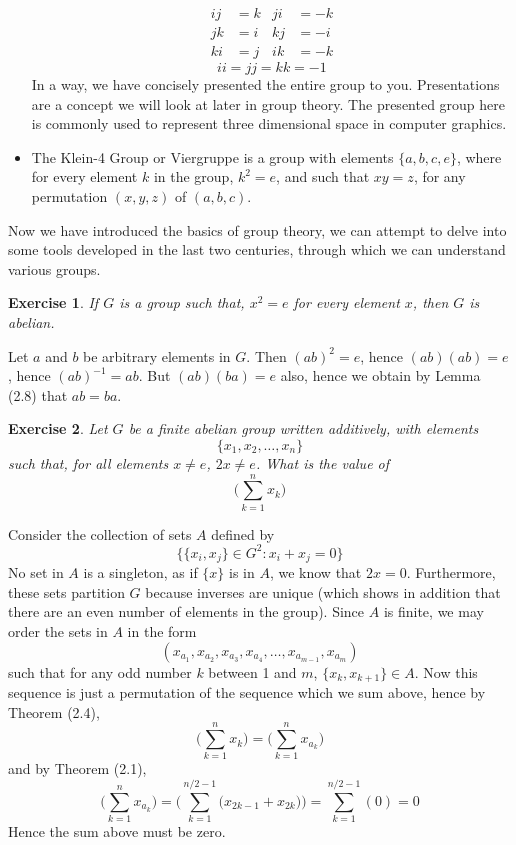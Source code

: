 \documentclass[12pt]{amsbook}
\makeatletter
\theoremstyle{plain}
\newtheorem{exercise}{Exercise}
\theoremstyle{definition}
\renewenvironment{proof}[1][\proofname]{\par
  \pushQED{\qed}%
  \normalfont \topsep6\p@\@plus6\p@\relax
  \list{}{\leftmargin=0em
          \rightmargin=\leftmargin
          \settowidth{\itemindent}{\itshape#1}%
          \labelwidth=\itemindent}

  \item[\hskip\labelsep
        \itshape
    #1\@addpunct{.}]\ignorespaces
}{%
  \popQED\endlist\@endpefalse
}
\makeatother
\begin{document}
\begin{itemize}
    \begin{align*}
                   ij &= k & ji &= -k\\
                   jk &= i & kj &= -i\\
                   ki &= j & ik &= -k
    \end{align*}
    \[ii = jj = kk = -1\]
    In a way, we have concisely presented the entire group to you. Presentations are a concept we will look at later in group theory. The presented group here is commonly used to represent three dimensional space in computer graphics.
    \item The Klein-4 Group  or Viergruppe  is a group with elements $\{ a,b,c,e \}$, where for every element $k$ in the group, $k^2 = e$, and such that $xy = z$, for any permutation $(x,y,z)$ of $(a,b,c)$.
\end{itemize}

Now we have introduced the basics of group theory, we can attempt to delve into some tools developed in the last two centuries, through which we can understand various groups.

\begin{exercise}
    If $G$ is a group such that, $x^2 = e$ for every element $x$, then $G$ is abelian.
\end{exercise}
\begin{proof}
    Let $a$ and $b$ be arbitrary elements in $G$. Then $(ab)^2 = e$, hence $(ab)(ab) = e$, hence $(ab)^{-1} = ab$. But $(ab)(ba) = e$ also, hence we obtain by Lemma (2.8) that $ab = ba$.
\end{proof}

\begin{exercise}
    Let $G$ be a finite abelian group written additively, with elements
    \[ \{ x_1, x_2, \dots, x_n \} \]
    such that, for all elements $x \neq e$, $2x \neq e$. What is the value of
    \[ \bigg( \sum_{k = 1}^n x_k \bigg) \]
\end{exercise}
\begin{proof}
    Consider the collection of sets $A$ defined by
    \[ \{ \{ x_i, x_j \} \in G^2 : x_i + x_j = 0 \} \]
    No set in $A$ is a singleton, as if $\{ x \}$ is in $A$, we know that $2x = 0$. Furthermore, these sets partition $G$ because inverses are unique (which shows in addition that there are an even number of elements in the group). Since $A$ is finite, we may order the
    sets in $A$ in the form
    \[ (x_{a_1}, x_{a_2}, x_{a_3}, x_{a_4}, \dots, x_{a_{m-1}}, x_{a_m}) \]
    such that for any odd number $k$ between 1 and $m$, $\{ x_k, x_{k+1} \} \in A$. Now this sequence is just a permutation of the sequence which we sum above, hence by Theorem (2.4),
    \[ \bigg( \sum_{k = 1}^n x_k \bigg) = \bigg( \sum_{k = 1}^n x_{a_k} \bigg) \]
    and by Theorem (2.1),
    \[ \bigg( \sum_{k = 1}^n x_{a_k} \bigg) = \bigg( \sum_{k = 1}^{n/2 - 1} \big(x_{2k - 1} + x_{2k}\big) \bigg) = \sum_{k = 1}^{n/2 - 1} (0) = 0 \]
    Hence the sum above must be zero.
\end{proof}
\end{document}
